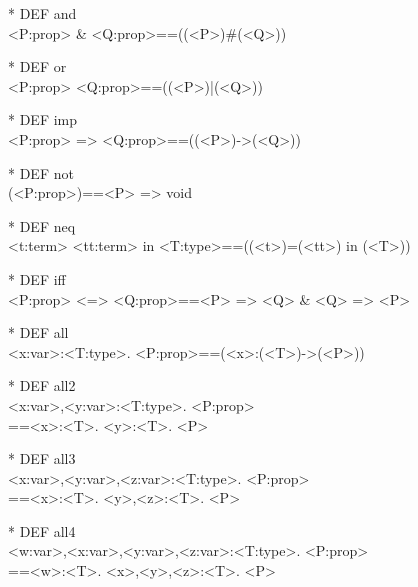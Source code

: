 \begin{prl*}
\>* DEF and\\
\>  <P:prop> \& <Q:prop>==((<P>)\#(<Q>))
\end{prl*}

\begin{prl*}
\>* DEF or\\
\>  <P:prop> \mvee{} <Q:prop>==((<P>)|(<Q>))
\end{prl*}

\begin{prl*}
\>* DEF imp\\
\>  <P:prop> => <Q:prop>==((<P>)->(<Q>))
\end{prl*}

\begin{prl*}
\>* DEF not\\
\>  \mneg{}(<P:prop>)==<P> => void
\end{prl*}

\begin{prl*}
\>* DEF neq\\
\>  <t:term> \mneq{} <tt:term> in <T:type>==\mneg{}((<t>)=(<tt>) in (<T>))
\end{prl*}

\begin{prl*}
\>* DEF iff\\
\>  <P:prop> \mbackslash{}<=> <Q:prop>==<P> => <Q> \& <Q> => <P>
\end{prl*}

\begin{prl*}
\>* DEF all\\
\>  \mforall{}<x:var>:<T:type>. <P:prop>==(<x>:(<T>)->(<P>))
\end{prl*}

\begin{prl*}
\>* DEF all2\\
\>  \mforall{}<x:var>,<y:var>:<T:type>. <P:prop>\\
\>  ==\mforall{}<x>:<T>. \mforall{}<y>:<T>. <P>
\end{prl*}

\begin{prl*}
\>* DEF all3\\
\>  \mforall{}<x:var>,<y:var>,<z:var>:<T:type>. <P:prop>\\
\>  ==\mforall{}<x>:<T>. \mforall{}<y>,<z>:<T>. <P>
\end{prl*}

\begin{prl*}
\>* DEF all4\\
\>  \mforall{}<w:var>,<x:var>,<y:var>,<z:var>:<T:type>. <P:prop>\\
\>  ==\mforall{}<w>:<T>. \mforall{}<x>,<y>,<z>:<T>. <P>
\end{prl*}

